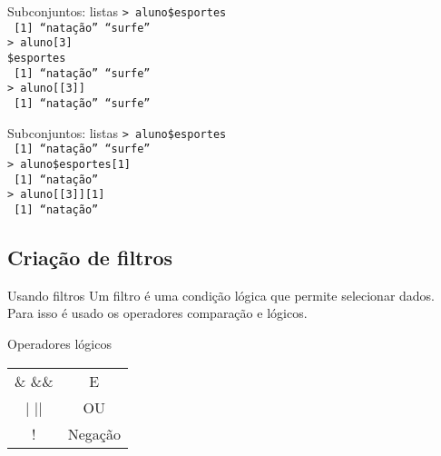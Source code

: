 \documentclass{beamer}
\begin{document}
\begin{frame}{Subconjuntos: listas}
\texttt{> aluno\$esportes\\
~[1] ``natação'' ``surfe'' \\ \vspace{10pt} \pause
> aluno[3]\\
\$esportes\\
~[1] ``natação'' ``surfe'' \\ \vspace{10pt} \pause
> aluno[[3]]\\
~[1] ``natação'' ``surfe'' }

\end{frame}

\begin{frame}{Subconjuntos: listas}
\texttt{> aluno\$esportes\\
~[1] ``natação'' ``surfe'' \\ \vspace{10pt} \pause
> aluno\$esportes[1]\\
~[1] ``natação''\\ \vspace{10pt} \pause
> aluno[[3]][1]\\
~[1] ``natação''}  
\end{frame}
\subsection{Criação de filtros}
\begin{frame}{Usando filtros}
Um filtro é uma condição lógica que permite selecionar dados.\\
Para isso é usado os operadores comparação e lógicos. \\
\begin{block}{Operadores lógicos}
\begin{table}[!h]
\begin{tabular}{cc} 
\& \&\&& E \\
| || & OU \\
!& Negação \\
\end{tabular} 
\end{table}  
\end{block}  
\end{frame}
\end{document}
